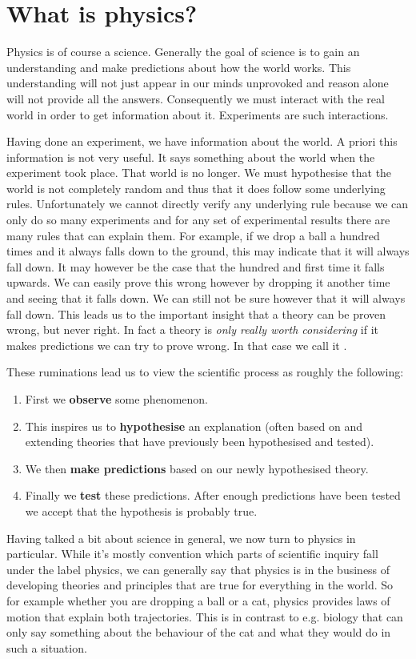 \documentclass{report}
\begin{document}
\chapter{What is physics?}
Physics is of course a science. Generally the goal of science is to gain an understanding and make predictions about how the world works. This understanding will not just appear in our minds unprovoked and reason alone will not provide all the answers. Consequently we must interact with the real world in order to get information about it. Experiments are such interactions.

Having done an experiment, we have information about the world. A priori this information is not very useful. It says something about the world when the experiment took place. That world is no longer. We must hypothesise that the world is not completely random and thus that it does follow some underlying rules. Unfortunately we cannot directly verify any underlying rule because we can only do so many experiments and for any set of experimental results there are many rules that can explain them. For example, if we drop a ball a hundred times and it always falls down to the ground, this may indicate that it will always fall down. It may however be the case that the hundred and first time it falls upwards. We can easily prove this wrong however by dropping it another time and seeing that it falls down. We can still not be sure however that it will always fall down. This leads us to the important insight that a theory can be proven wrong, but never right. In fact a theory is \textit{only really worth considering} if it makes predictions we can try to prove wrong. In that case we call it .

These ruminations lead us to view the scientific process as roughly the following: 
\begin{enumerate}
\item First we \textbf{observe} some phenomenon.
\item This inspires us to \textbf{hypothesise} an explanation (often based on and extending theories that have previously been hypothesised and tested).
\item We then \textbf{make predictions} based on our newly hypothesised theory.
\item Finally we \textbf{test} these predictions. After enough predictions have been tested we accept that the hypothesis is probably true.
\end{enumerate}

Having talked a bit about science in general, we now turn to physics in particular. While it's mostly convention which parts of scientific inquiry fall under the label physics, we can generally say that physics is in the business of developing theories and principles that are true for everything in the world. So for example whether you are dropping a ball or a cat, physics provides laws of motion that explain both trajectories. This is in contrast to e.g. biology that can only say something about the behaviour of the cat and what they would do in such a situation.
\end{document}
